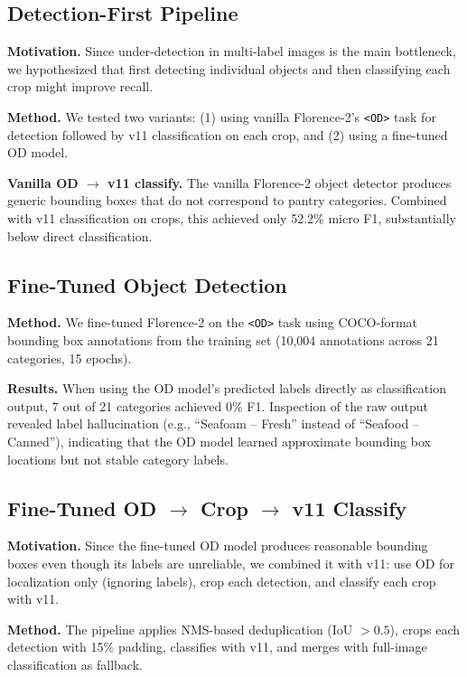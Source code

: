 \subsection{Detection-First Pipeline}
\label{ssec:detect_first}

\textbf{Motivation.} Since under-detection in multi-label images is the main bottleneck, we hypothesized that first detecting individual objects and then classifying each crop might improve recall.

\textbf{Method.} We tested two variants: (1) using vanilla Florence-2's \texttt{<OD>} task for detection followed by v11 classification on each crop, and (2) using a fine-tuned OD model.

\textbf{Vanilla OD $\rightarrow$ v11 classify.} The vanilla Florence-2 object detector produces generic bounding boxes that do not correspond to pantry categories. Combined with v11 classification on crops, this achieved only 52.2\% micro F1, substantially below direct classification.

\subsection{Fine-Tuned Object Detection}
\label{ssec:finetuned_od}

\textbf{Method.} We fine-tuned Florence-2 on the \texttt{<OD>} task using COCO-format bounding box annotations from the training set (10,004 annotations across 21 categories, 15 epochs).

\textbf{Results.} When using the OD model's predicted labels directly as classification output, 7 out of 21 categories achieved 0\% F1. Inspection of the raw output revealed label hallucination (e.g., ``Seafoam -- Fresh'' instead of ``Seafood -- Canned''), indicating that the OD model learned approximate bounding box locations but not stable category labels.

\subsection{Fine-Tuned OD $\rightarrow$ Crop $\rightarrow$ v11 Classify}
\label{ssec:od_crop_classify}

\textbf{Motivation.} Since the fine-tuned OD model produces reasonable bounding boxes even though its labels are unreliable, we combined it with v11: use OD for localization only (ignoring labels), crop each detection, and classify each crop with v11.

\textbf{Method.} The pipeline applies NMS-based deduplication (IoU $> 0.5$), crops each detection with 15\% padding, classifies with v11, and merges with full-image classification as fallback.

